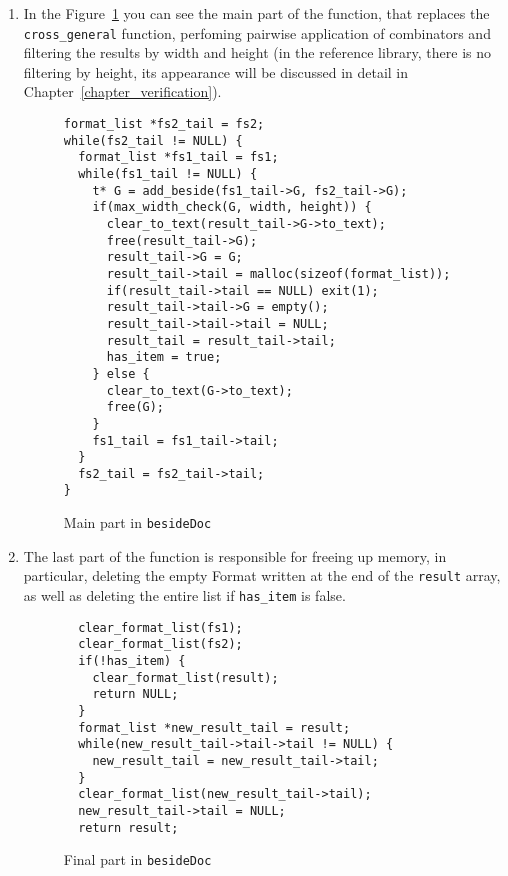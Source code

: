\documentclass[14pt]{constructor-diploma}
\begin{document}
\begin{enumerate}
\item In the Figure~\ref{fig:beside_doc_main} you can see the main part of the function, that replaces the \texttt{cross\_general} function, perfoming pairwise application of combinators and filtering the results by width and height 
(in the reference library, there is no filtering by height, its appearance will be discussed in detail in Chapter~\ref{chapter_verification}).
\begin{figure}[H]
\begin{mdframed}[backgroundcolor=bg]
\begin{verbatim}
format_list *fs2_tail = fs2;
while(fs2_tail != NULL) {
  format_list *fs1_tail = fs1;
  while(fs1_tail != NULL) {
    t* G = add_beside(fs1_tail->G, fs2_tail->G);
    if(max_width_check(G, width, height)) {
      clear_to_text(result_tail->G->to_text);
      free(result_tail->G);
      result_tail->G = G;
      result_tail->tail = malloc(sizeof(format_list));
      if(result_tail->tail == NULL) exit(1);
      result_tail->tail->G = empty();
      result_tail->tail->tail = NULL;
      result_tail = result_tail->tail;
      has_item = true;
    } else {
      clear_to_text(G->to_text);
      free(G);
    }
    fs1_tail = fs1_tail->tail;
  }
  fs2_tail = fs2_tail->tail;
}
\end{verbatim}
\end{mdframed}
\caption{Main part in \texttt{besideDoc}}
\label{fig:beside_doc_main}
\end{figure}

\item The last part of the function is responsible for freeing up memory, in particular, deleting the empty Format written at the end of the \texttt{result} array, 
as well as deleting the entire list if \texttt{has\_item} is false.
\begin{figure}[H]
\begin{mdframed}[backgroundcolor=bg]
\begin{verbatim}
  clear_format_list(fs1);
  clear_format_list(fs2);
  if(!has_item) {
    clear_format_list(result);
    return NULL;
  }
  format_list *new_result_tail = result;
  while(new_result_tail->tail->tail != NULL) {
    new_result_tail = new_result_tail->tail;
  }
  clear_format_list(new_result_tail->tail);
  new_result_tail->tail = NULL;
  return result;
\end{verbatim}
\end{mdframed}
\caption{Final part in \texttt{besideDoc}}
\label{fig:beside_doc_free}
\end{figure}
\end{enumerate}
\end{document}
